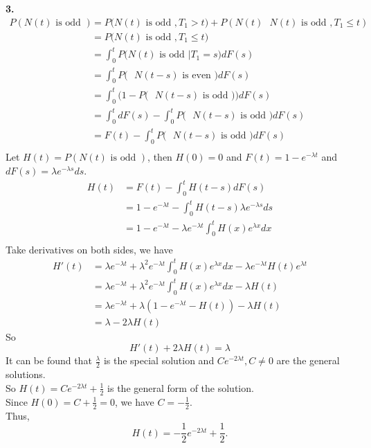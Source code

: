 \documentclass{amsart}
\theoremstyle{plain}
\theoremstyle{definition}
\begin{document}
\noindent \textbf{3.}\\

\begin{align*}
	P(N(t) \text{ is odd } ) &= P\big(N(t) \text{ is odd }, T_1 > t\big) + P(N(t) \text{ $N(t)$ is odd }, T_1 \leq t) \\
							 &= P\big(N(t)\text{ is odd }, T_1 \leq t\big) \\
						 	 &= \int_{0}^{t}P\big(N(t) \text{ is odd }|T_1 = s\big)dF(s) \\
							 &= \int_{0}^{t}P\big(\text{ $N(t-s)$ is even })dF(s) \\
							 &= \int_{0}^{t}\Big(1-P\big(\text{ $N(t-s)$ is odd }\big)\Big)dF(s) \\
							 &= \int_{0}^{t}dF(s) -\int_{0}^{t}P\big(\text{ $N(t-s)$ is odd }\big)dF(s) \\
							 &= F(t) -\int_{0}^{t}P\big(\text{ $N(t-s)$ is odd }\big)dF(s) \\
\end{align*}
Let $H(t) = P(N(t) \text{ is odd } )$, then $H(0) = 0$ and $F(t) = 1 -e^{-\lambda t}$ and $dF(s) = \lambda e^{-\lambda s}ds$.
\begin{align*}
	H(t) &= F(t)-\int_{0}^{t}H(t-s)dF(s) \\
			   &= 1 -e^{-\lambda t} - \int_{0}^{t}H(t-s) \lambda e^{-\lambda s}ds \\
			   &=1 -e^{-\lambda t} - \lambda e^{-\lambda t}\int_{0}^{t}H(x)e^{\lambda x}dx \\
\end{align*}
Take derivatives on both sides, we have\\
\begin{align*}
	H'(t) &= \lambda e^{-\lambda t} +\lambda^2e^{-\lambda t}\int_{0}^{t}H(x)e^{\lambda x}dx-\lambda e^{-\lambda t}H(t)e^{\lambda t}\\
		  &= \lambda e^{-\lambda t} +\lambda^2e^{-\lambda t}\int_{0}^{t}H(x)e^{\lambda x}dx-\lambda H(t)\\
		  &= \lambda e^{-\lambda t} + \lambda(1-e^{-\lambda t}-H(t)) -\lambda H(t)\\
		  &= \lambda - 2\lambda H(t) 
\end{align*}
So 
\[H'(t) + 2\lambda H(t) = \lambda \]
It can be found that $\frac{\lambda}{2}$ is the special solution and $Ce^{-2\lambda t}, C \neq 0$ are the general solutions.\\
So $H(t) = Ce^{-2\lambda t} + \frac{1}{2}$ is the general form of the solution.\\
Since $H(0) = C+ \frac{1}{2} = 0$, we have $C = -\frac{1}{2}$.\\
Thus,
\[ H(t) = -\frac{1}{2}e^{-2\lambda t} + \frac{1}{2}.\]
\end{document}
